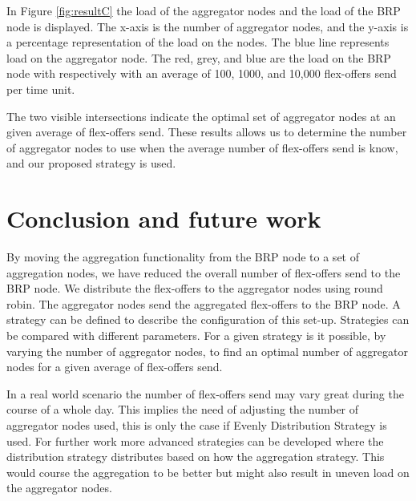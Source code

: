 \documentclass{ifacconf}
\begin{document}
In Figure \ref{fig:resultC} the load of the aggregator nodes and the load of the BRP node is displayed.
The x-axis is the number of aggregator nodes, and the y-axis is a percentage representation of the load on the nodes.
The blue line represents load on the aggregator node.
The red, grey, and blue are the load on the BRP node with respectively with an average of 100, 1000, and 10,000 flex-offers send per time unit.

The two visible intersections indicate the optimal set of aggregator nodes at an given average of flex-offers send. 
These results allows us to determine the number of aggregator nodes to use when the average number of flex-offers send is know, and our proposed strategy is used.   

\section{Conclusion and future work}
By moving the aggregation functionality from the BRP node to a set of aggregation nodes, we have reduced the overall number of flex-offers send to the BRP node.
We distribute the flex-offers to the aggregator nodes using round robin.   
The aggregator nodes send the aggregated flex-offers to the BRP node.
A strategy can be defined to describe the configuration of this set-up.
Strategies can be compared with different parameters. 
For a given strategy is it possible, by varying the number of aggregator nodes, to find an optimal number of aggregator nodes for a given average of flex-offers send.


In a real world scenario the number of flex-offers send may vary great during the course of a whole day. 
This implies the need of adjusting the number of aggregator nodes used, this is only the case if Evenly Distribution Strategy is used.
For further work more advanced strategies can be developed where the distribution strategy distributes based on how the aggregation strategy. 
This would course the aggregation to be better but might also result in uneven load on the aggregator nodes.  



\appendix
{}
\end{document}
